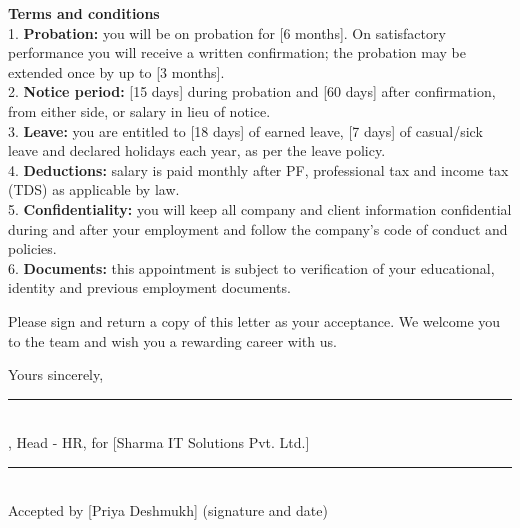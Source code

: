 \documentclass[10pt]{article}
\begin{document}
\par

\vspace{4pt}

\noindent\colorbox{notebg}{\parbox{\dimexpr\linewidth-2\fboxsep}{\footnotesize {\color{accent}\bfseries Terms and conditions}\\ 1. \textbf{Probation:} you will be on probation for [6 months]. On satisfactory performance you will receive a written confirmation; the probation may be extended once by up to [3 months].\\ 2. \textbf{Notice period:} [15 days] during probation and [60 days] after confirmation, from either side, or salary in lieu of notice.\\ 3. \textbf{Leave:} you are entitled to [18 days] of earned leave, [7 days] of casual/sick leave and declared holidays each year, as per the leave policy.\\ 4. \textbf{Deductions:} salary is paid monthly after PF, professional tax and income tax (TDS) as applicable by law.\\ 5. \textbf{Confidentiality:} you will keep all company and client information confidential during and after your employment and follow the company's code of conduct and policies.\\ 6. \textbf{Documents:} this appointment is subject to verification of your educational, identity and previous employment documents.}}\par\vspace{6pt}

Please sign and return a copy of this letter as your acceptance. We welcome you to the team and wish you a rewarding career with us.\par\vspace{4pt}

Yours sincerely,\par\vspace{4pt}

\vspace{32pt}\noindent\parbox[t]{0.3\linewidth}{\centering\rule{\linewidth}{0.5pt}\\ [Neha Kulkarni], Head - HR, for [Sharma IT Solutions Pvt. Ltd.]}\hfill\parbox[t]{0.3\linewidth}{\centering\rule{\linewidth}{0.5pt}\\ Accepted by [Priya Deshmukh] (signature and date)}\par
\end{document}
